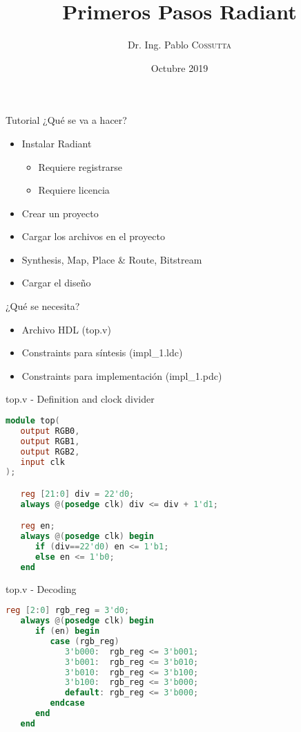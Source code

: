 \documentclass{beamer}
\title[Primeros Pasos]{Primeros Pasos Radiant}
\subtitle{}
\author{Dr. Ing. Pablo \textsc{Cossutta}}
\date{Octubre 2019}
\begin{document}
\beamertemplatenavigationsymbolsempty %
\maketitle
\logo{}

\begin{frame}{Tutorial}
¿Qué se va a hacer?
\begin{itemize}
	\item Instalar Radiant
	\begin{itemize}
		\item Requiere registrarse
		\item Requiere licencia
	\end{itemize}
	\item Crear un proyecto
	\item Cargar los archivos en el proyecto
	\item Synthesis, Map, Place \& Route, Bitstream
	\item Cargar el diseño
\end{itemize}
¿Qué se necesita?
\begin{itemize}
	\item Archivo HDL (top.v)
	\item Constraints para síntesis (impl\_1.ldc)
	\item Constraints para implementación (impl\_1.pdc)	
\end{itemize}
\end{frame}
    
\begin{frame}[fragile]{top.v - Definition and clock divider}
\begin{lstlisting}[language=Verilog]
module top(
   output RGB0,
   output RGB1,
   output RGB2,
   input clk
);

   reg [21:0] div = 22'd0;
   always @(posedge clk) div <= div + 1'd1;

   reg en;
   always @(posedge clk) begin
      if (div==22'd0) en <= 1'b1;
      else en <= 1'b0;
   end
\end{lstlisting}
\end{frame}

\begin{frame}[fragile]{top.v - Decoding}
\begin{lstlisting}[language=Verilog]
   reg [2:0] rgb_reg = 3'd0;
   always @(posedge clk) begin
      if (en) begin
         case (rgb_reg)
            3'b000:  rgb_reg <= 3'b001;
            3'b001:  rgb_reg <= 3'b010;
            3'b010:  rgb_reg <= 3'b100;
            3'b100:  rgb_reg <= 3'b000;
            default: rgb_reg <= 3'b000;
         endcase
      end
   end
\end{lstlisting}
\end{frame}
\end{document}
